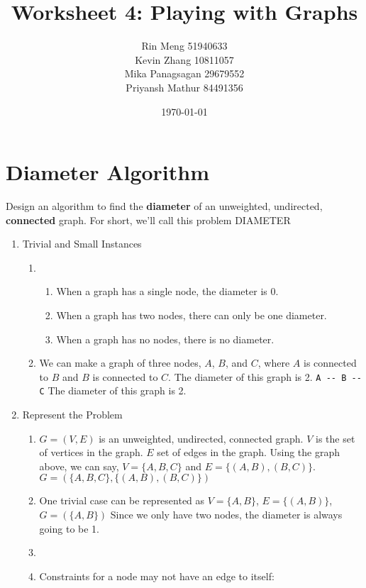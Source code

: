 \documentclass[12pt]{article}
\title{Worksheet 4: Playing with Graphs}
\author{Rin Meng 51940633 \\ Kevin Zhang 10811057 \\ Mika Panagsagan 29679552 \\ Priyansh Mathur 84491356}
\date{\today}
\begin{document}
\maketitle

\setcounter{section}{2}

\section{Diameter Algorithm}

Design an algorithm to find the \textbf{diameter} of an unweighted, 
undirected, \textbf{connected} graph. For short,
we’ll call this problem DIAMETER

\renewcommand{\theenumi}{3.\arabic{enumi}}
\begin{enumerate}
\item Trivial and Small Instances
    \begin{enumerate}[1.]
        \item \begin{enumerate}
            \item When a graph has a single node, the diameter is 0.
            \item When a graph has two nodes, there can only be one diameter.
            \item When a graph has no nodes, there is no diameter.
        \end{enumerate}
        \item We can make a graph of three nodes, $A$, $B$, and $C$, 
        where $A$ is connected to $B$ and $B$ is connected to $C$. 
        The diameter of this graph is 2. \verb|A -- B -- C| 
        The diameter of this graph is 2.
    \end{enumerate}
\item Represent the Problem
    \begin{enumerate}[1.]
        \item $G = (V, E)$ is an unweighted, undirected, connected graph.
        $V$ is the set of vertices in the graph. $E$ set of edges in the graph.
        Using the graph above, we can say, $V = \{A, B, C\}$ and $E = \{(A, B), (B, C)\}$.
        $G = (\{A, B, C\}, \{(A, B), (B, C)\})$
        \item One trivial case can be represented as $V = \{A, B\}$,
         $E = \{(A, B)\}$, $G = (\{A, B\})$
         Since we only have two nodes, the diameter is always going to be 1.
        \item 
        \item 
        Constraints for a node may not have an edge to itself: 

\end{enumerate}
\end{enumerate}
\end{document}
